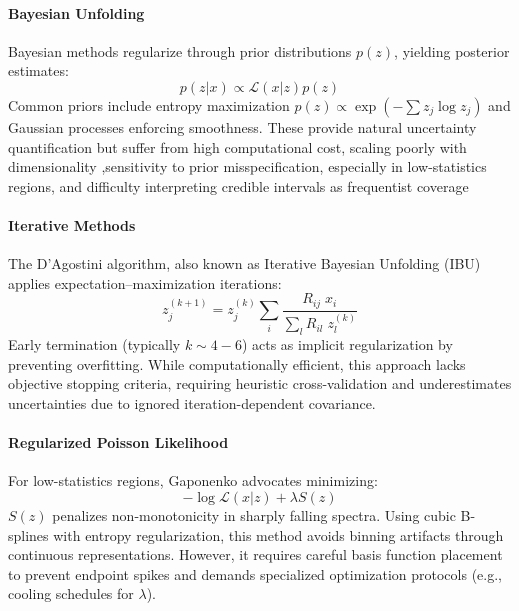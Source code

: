 \paragraph{Bayesian Unfolding}  
Bayesian methods regularize through prior distributions \(p(z)\), yielding posterior estimates:  
\begin{equation}
    p({z}|{x}) \propto \mathcal{L}({x}|{z})p({z})
\end{equation}  
%
Common priors include entropy maximization \(p(z) \propto \exp(-\sum z_j \log z_j)\) and Gaussian processes enforcing smoothness.
%
These provide natural uncertainty quantification but suffer from high computational cost, scaling poorly with dimensionality ,sensitivity to prior misspecification, especially in low-statistics regions, and difficulty interpreting credible intervals as frequentist coverage

\paragraph{Iterative Methods}  
The D’Agostini algorithm, also known as Iterative Bayesian Unfolding (IBU) applies expectation--maximization iterations:  
\begin{equation}
    z_j^{(k+1)} = z_j^{(k)} \sum_i \frac{R_{ij}\;x_i}{\sum_l R_{il}\;z_l^{(k)}}
\end{equation}  
Early termination (typically \(k \sim 4-6\)) acts as implicit regularization by preventing overfitting. While computationally efficient, this approach lacks objective stopping criteria, requiring heuristic cross-validation and underestimates uncertainties due to ignored iteration-dependent covariance.

\paragraph{Regularized Poisson Likelihood}  
For low-statistics regions, Gaponenko advocates minimizing:  
\begin{equation}
     -\log \mathcal{L}({x}|z) + \lambda S({z})
\end{equation}  
\(S(z)\) penalizes non-monotonicity in sharply falling spectra.
%
Using cubic B-splines with entropy regularization, this method avoids binning artifacts through continuous representations.
%
However, it requires careful basis function placement to prevent endpoint spikes and demands specialized optimization protocols (e.g., cooling schedules for \(\lambda\)).  


